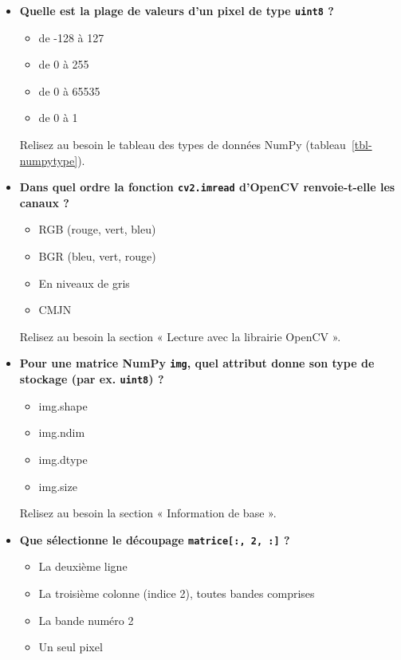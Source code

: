 \documentclass[
  french,
  11pt,
  letterpaper,
  open=any,
  twoside=false,
  french]{scrbook}
\providecommand{\tightlist}{%
  \setlength{\itemsep}{0pt}\setlength{\parskip}{0pt}}
\begin{document}
\begin{itemize}
  Relisez au besoin la section « Importation d'images » : quatre
  caractéristiques principales.
\item
  \textbf{Quelle est la plage de valeurs d'un pixel de type
  \texttt{uint8} ?}

  \begin{itemize}
  \tightlist
  \item
    de -128 à 127
  \item
    de 0 à 255
  \item
    de 0 à 65535
  \item
    de 0 à 1
  \end{itemize}

  Relisez au besoin le tableau des types de données NumPy
  (tableau~\ref{tbl-numpytype}).
\item
  \textbf{Dans quel ordre la fonction \texttt{cv2.imread} d'OpenCV
  renvoie-t-elle les canaux ?}

  \begin{itemize}
  \tightlist
  \item
    RGB (rouge, vert, bleu)
  \item
    BGR (bleu, vert, rouge)
  \item
    En niveaux de gris
  \item
    CMJN
  \end{itemize}

  Relisez au besoin la section « Lecture avec la librairie OpenCV ».
\item
  \textbf{Pour une matrice NumPy \texttt{img}, quel attribut donne son
  type de stockage (par ex. \texttt{uint8}) ?}

  \begin{itemize}
  \tightlist
  \item
    img.shape
  \item
    img.ndim
  \item
    img.dtype
  \item
    img.size
  \end{itemize}

  Relisez au besoin la section « Information de base ».
\item
  \textbf{Que sélectionne le découpage \texttt{matrice{[}:,\ 2,\ :{]}}
  ?}

  \begin{itemize}
  \tightlist
  \item
    La deuxième ligne
  \item
    La troisième colonne (indice 2), toutes bandes comprises
  \item
    La bande numéro 2
  \item
    Un seul pixel
  \end{itemize}


\end{itemize}
\end{document}
